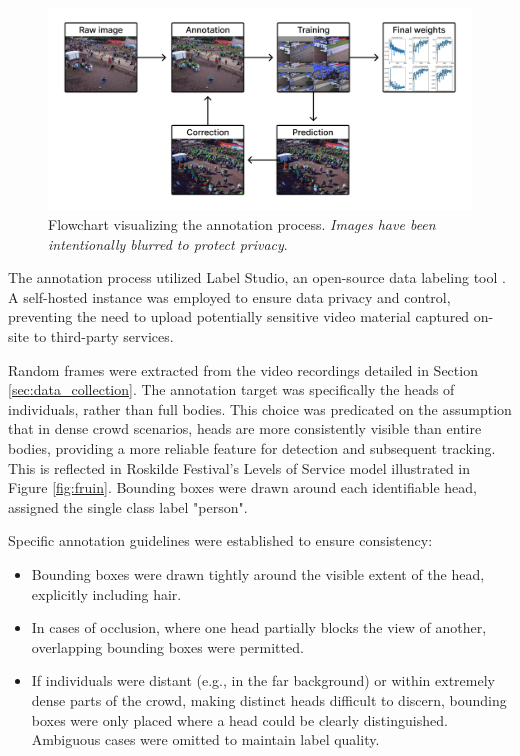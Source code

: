 \begin{figure}[htb!]
  \centering
  \includegraphics[width=\textwidth]{Pictures/Figures/annotation_flowchart.png}
  \caption{Flowchart visualizing the annotation process. \textit{Images have been intentionally blurred to protect privacy}.}
  \label{fig:annotation_flowchart}
\end{figure}

The annotation process utilized Label Studio, an open-source data labeling tool \cite{label_studio}. A self-hosted instance was employed to ensure data privacy and control, preventing the need to upload potentially sensitive video material captured on-site to third-party services.

Random frames were extracted from the video recordings detailed in Section \ref{sec:data_collection}. The annotation target was specifically the heads of individuals, rather than full bodies. This choice was predicated on the assumption that in dense crowd scenarios, heads are more consistently visible than entire bodies, providing a more reliable feature for detection and subsequent tracking. This is reflected in Roskilde Festival's Levels of Service model illustrated in Figure \ref{fig:fruin}. Bounding boxes were drawn around each identifiable head, assigned the single class label "person".

Specific annotation guidelines were established to ensure consistency:
\begin{itemize}
  \item Bounding boxes were drawn tightly around the visible extent of the head, explicitly including hair.
  \item In cases of occlusion, where one head partially blocks the view of another, overlapping bounding boxes were permitted.
  \item If individuals were distant (e.g., in the far background) or within extremely dense parts of the crowd, making distinct heads difficult to discern, bounding boxes were only placed where a head could be clearly distinguished. Ambiguous cases were omitted to maintain label quality.
\end{itemize}

